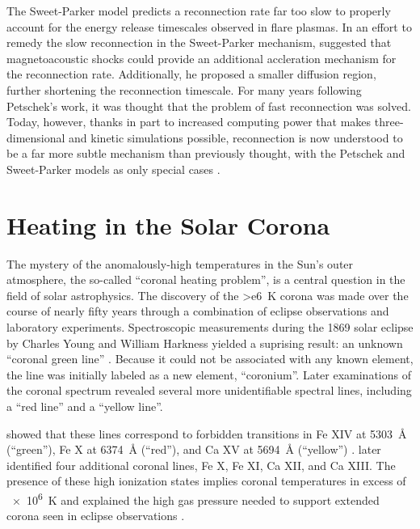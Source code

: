The Sweet-Parker model predicts a reconnection rate far too slow to properly account for the energy release timescales observed in flare plasmas. In an effort to remedy the slow reconnection in the Sweet-Parker mechanism, \citet{petschek_magnetic_1964} suggested that magnetoacoustic shocks could provide an additional accleration mechanism for the reconnection rate. Additionally, he proposed a smaller diffusion region, further shortening the reconnection timescale. For many years following Petschek's work, it was thought that the problem of fast reconnection was solved. Today, however, thanks in part to increased computing power that makes three-dimensional and kinetic simulations possible, reconnection is now understood to be a far more subtle mechanism than previously thought, with the Petschek and Sweet-Parker models as only special cases \citep{priest_magnetic_2000}.

\section{Heating in the Solar Corona}\label{sec:coronal-heating}

The mystery of the anomalously-high temperatures in the Sun's outer atmosphere, the so-called ``coronal heating problem'', is a central question in the field of solar astrophysics. The discovery of the \SI{>e6}{\kelvin} corona was made over the course of nearly fifty years through a combination of eclipse observations and laboratory experiments. Spectroscopic measurements during the 1869 solar eclipse by Charles Young and William Harkness yielded a suprising result: an unknown ``coronal green line'' \citep{golub_solar_2010}. Because it could not be associated with any known element, the line was initially labeled as a new element, ``coronium''. Later examinations of the coronal spectrum revealed several more unidentifiable spectral lines, including a ``red line'' and a ``yellow line''.

\citet{grotrian_zur_1939} showed that these lines correspond to forbidden transitions in Fe XIV at \SI{5303}{\angstrom} (``green''), Fe X at \SI{6374}{\angstrom} (``red''), and Ca XV at \SI{5694}{\angstrom} (``yellow'') \citep[from Table 2.1 of][]{golub_solar_2010}. \citet{edlen_deutung_1943} later identified four additional coronal lines, Fe X, Fe XI, Ca XII, and Ca XIII. The presence of these high ionization states implies coronal temperatures in excess of \SI{e6}{\kelvin} and explained the high gas pressure needed to support extended corona seen in eclipse observations \citep{golub_solar_2010}.

